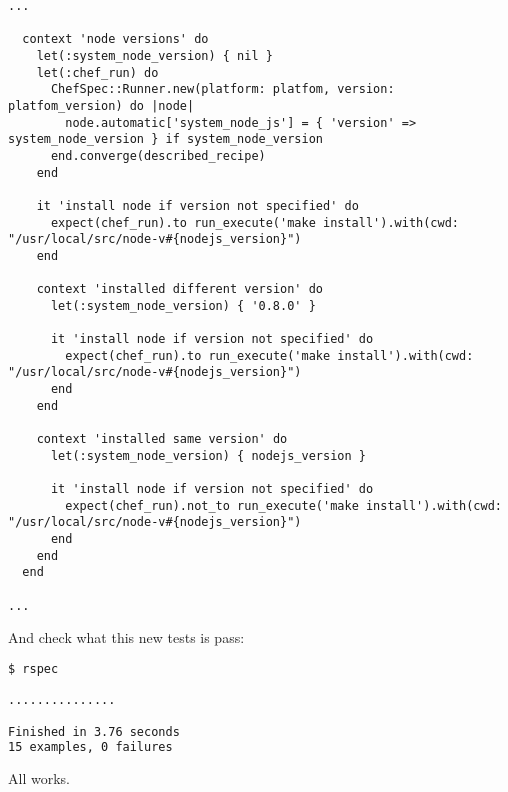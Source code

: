 \begin{lstlisting}[label=lst:testing-fauxhai2,title=my-server-cloud/site-cookbooks/my\_cool\_app/spec/unit/recipes/node\_spec.rb]
...

  context 'node versions' do
    let(:system_node_version) { nil }
    let(:chef_run) do
      ChefSpec::Runner.new(platform: platfom, version: platfom_version) do |node|
        node.automatic['system_node_js'] = { 'version' => system_node_version } if system_node_version
      end.converge(described_recipe)
    end

    it 'install node if version not specified' do
      expect(chef_run).to run_execute('make install').with(cwd: "/usr/local/src/node-v#{nodejs_version}")
    end

    context 'installed different version' do
      let(:system_node_version) { '0.8.0' }

      it 'install node if version not specified' do
        expect(chef_run).to run_execute('make install').with(cwd: "/usr/local/src/node-v#{nodejs_version}")
      end
    end

    context 'installed same version' do
      let(:system_node_version) { nodejs_version }

      it 'install node if version not specified' do
        expect(chef_run).not_to run_execute('make install').with(cwd: "/usr/local/src/node-v#{nodejs_version}")
      end
    end
  end

...
\end{lstlisting}

And check what this new tests is pass:

\begin{lstlisting}[language=Bash,label=lst:testing-fauxhai3]
$ rspec

...............

Finished in 3.76 seconds
15 examples, 0 failures
\end{lstlisting}

All works.